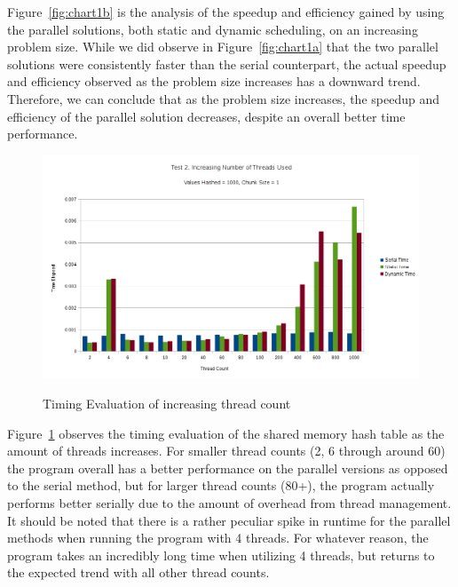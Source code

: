 \documentclass{article}
\begin{document}
Figure~\ref{fig:chart1b} is the analysis of the speedup and efficiency gained by using the parallel solutions, 
both static and dynamic scheduling, on an increasing problem size. While we did observe in Figure~\ref{fig:chart1a} 
that the two parallel solutions were consistently faster than the serial counterpart, the actual speedup and 
efficiency observed as the problem size increases has a downward trend. Therefore, we can conclude that as the 
problem size increases, the speedup and efficiency of the parallel solution decreases, despite an overall better 
time performance.

\begin{figure}[H]
  \caption{Timing Evaluation of increasing thread count}
  \centering
  \includegraphics[width=\textwidth]{chart2a}
    \label{fig:chart2a}
\end{figure}

Figure~\ref{fig:chart2a} observes the timing evaluation of the shared memory hash table as the amount of threads 
increases. For smaller thread counts (2, 6 through around 60) the program overall has a better performance on the 
parallel versions as opposed to the serial method, but for larger thread counts (80+), the program actually 
performs better serially due to the amount of overhead from thread management. It should be noted that there is 
a rather peculiar spike in runtime for the parallel methods when running the program with 4 threads. For whatever 
reason, the program takes an incredibly long time when utilizing 4 threads, but returns to the expected trend 
with all other thread counts.
\end{document}

